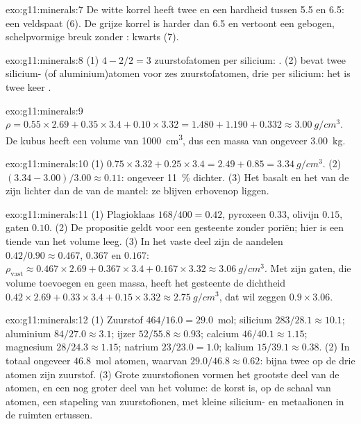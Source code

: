 \begin{solution}{exo:g11:minerals:7}
De witte korrel heeft twee  en een hardheid tussen 5.5 en 6.5: een
veldspaat (6). De grijze korrel is harder dan 6.5 en vertoont een gebogen,
schelpvormige breuk zonder : kwarts (7).
\end{solution}

\begin{solution}{exo:g11:minerals:8}
(1) $4 - 2/2 = 3$ zuurstofatomen per silicium: . (2)  bevat
twee silicium- (of aluminium)atomen voor zes zuurstofatomen, drie per silicium: het is
twee keer .
\end{solution}

\begin{solution}{exo:g11:minerals:9}
$\rho = 0.55 \times 2.69 + 0.35 \times 3.4 + 0.10 \times 3.32 = 1.480 + 1.190
+ 0.332 \approx \qty{3.00}{g/cm^3}$. De kubus heeft een volume van
\qty{1000}{cm^3}, dus een massa van ongeveer \qty{3.00}{kg}.
\end{solution}

\begin{solution}{exo:g11:minerals:10}
(1) $0.75 \times 3.32 + 0.25 \times 3.4 = 2.49 + 0.85 = \qty{3.34}{g/cm^3}$.
(2) $(3.34 - 3.00)/3.00 \approx 0.11$: ongeveer \qty{11}{\percent} dichter.
(3) Het basalt en het  van de  zijn lichter dan de
 van de mantel: ze blijven erbovenop liggen.
\end{solution}

\begin{solution}{exo:g11:minerals:11}
(1) Plagioklaas $168/400 = 0.42$, pyroxeen $0.33$, olivijn $0.15$, gaten
$0.10$. (2) De propositie geldt voor een gesteente zonder poriën; hier is een tiende van
het volume leeg. (3) In het vaste deel zijn de aandelen $0.42/0.90
\approx 0.467$, $0.367$ en $0.167$:
$\rho_{\text{vast}} \approx 0.467 \times 2.69 + 0.367 \times 3.4 + 0.167
\times 3.32 \approx \qty{3.06}{g/cm^3}$. Met zijn gaten, die volume toevoegen
en geen massa, heeft het gesteente de dichtheid $0.42 \times 2.69 + 0.33 \times 3.4 +
0.15 \times 3.32 \approx \qty{2.75}{g/cm^3}$, dat wil zeggen $0.9 \times 3.06$.
\end{solution}

\begin{solution}{exo:g11:minerals:12}
(1) Zuurstof $464/16.0 = 29.0$~mol; silicium $283/28.1 \approx 10.1$; aluminium
$84/27.0 \approx 3.1$; ijzer $52/55.8 \approx 0.93$; calcium $46/40.1 \approx
1.15$; magnesium $28/24.3 \approx 1.15$; natrium $23/23.0 = 1.0$; kalium
$15/39.1 \approx 0.38$. (2) In totaal ongeveer $46.8$~mol atomen, waarvan
$29.0/46.8 \approx 0.62$: bijna twee op de drie atomen zijn zuurstof.
(3) Grote zuurstofionen vormen het grootste deel van de atomen, en een nog groter deel van het
volume: de korst is, op de schaal van atomen, een stapeling van zuurstofionen, met
kleine silicium- en metaalionen in de ruimten ertussen.
\end{solution}

